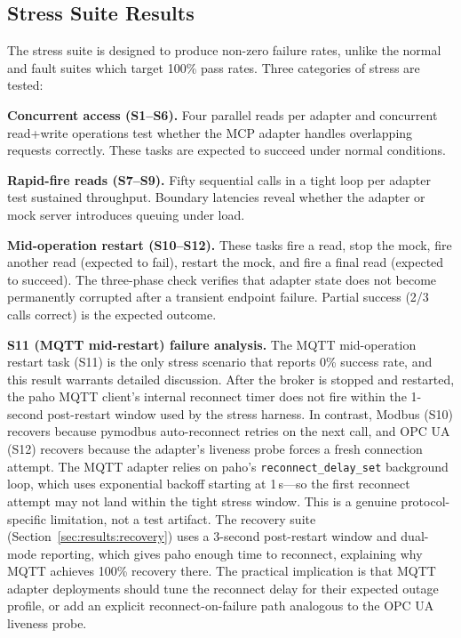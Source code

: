 \documentclass[conference]{IEEEtran}
\begin{document}
\subsection{Stress Suite Results}
\label{sec:results:stress}

The stress suite is designed to produce non-zero failure rates, unlike the normal and fault suites which target 100\% pass rates. Three categories of stress are tested:

\textbf{Concurrent access (S1--S6).} Four parallel reads per adapter and concurrent read+write operations test whether the MCP adapter handles overlapping requests correctly. These tasks are expected to succeed under normal conditions.

\textbf{Rapid-fire reads (S7--S9).} Fifty sequential calls in a tight loop per adapter test sustained throughput. Boundary latencies reveal whether the adapter or mock server introduces queuing under load.

\textbf{Mid-operation restart (S10--S12).} These tasks fire a read, stop the mock, fire another read (expected to fail), restart the mock, and fire a final read (expected to succeed). The three-phase check verifies that adapter state does not become permanently corrupted after a transient endpoint failure. Partial success (2/3 calls correct) is the expected outcome.

\textbf{S11 (MQTT mid-restart) failure analysis.} The MQTT mid-operation restart task (S11) is the only stress scenario that reports 0\% success rate, and this result warrants detailed discussion. After the broker is stopped and restarted, the paho MQTT client's internal reconnect timer does not fire within the 1-second post-restart window used by the stress harness. In contrast, Modbus (S10) recovers because pymodbus auto-reconnect retries on the next call, and OPC UA (S12) recovers because the adapter's liveness probe forces a fresh connection attempt. The MQTT adapter relies on paho's \texttt{reconnect\_delay\_set} background loop, which uses exponential backoff starting at 1\,s---so the first reconnect attempt may not land within the tight stress window. This is a genuine protocol-specific limitation, not a test artifact. The recovery suite (Section~\ref{sec:results:recovery}) uses a 3-second post-restart window and dual-mode reporting, which gives paho enough time to reconnect, explaining why MQTT achieves 100\% recovery there. The practical implication is that MQTT adapter deployments should tune the reconnect delay for their expected outage profile, or add an explicit reconnect-on-failure path analogous to the OPC UA liveness probe.
\end{document}
